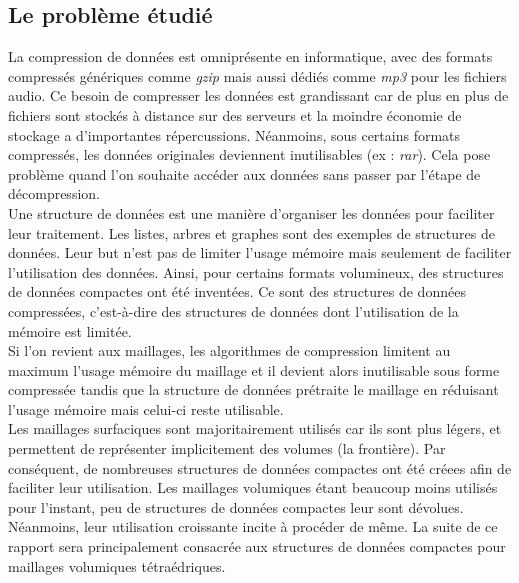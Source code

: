 \subsection*{Le problème étudié}
\noindent
La compression de données est omniprésente en informatique, avec des formats compressés génériques comme \textit{gzip} mais aussi dédiés comme \textit{mp3} pour les fichiers audio. Ce besoin de compresser les données est grandissant car de plus en plus de fichiers sont stockés à distance sur des serveurs et la moindre économie de stockage a d'importantes répercussions. Néanmoins, sous certains formats compressés, les données originales deviennent inutilisables (ex : \textit{rar}). Cela pose problème quand l'on souhaite accéder aux données  sans passer par l'étape de décompression.\\
Une structure de données est une manière d'organiser les données pour faciliter leur traitement. Les listes, arbres et graphes sont des exemples de structures de données. Leur but n'est pas de limiter l'usage mémoire mais seulement de faciliter l'utilisation des données. Ainsi, pour certains formats volumineux, des structures de données compactes ont été inventées. Ce sont des structures de données compressées, c'est-à-dire des structures de données dont l'utilisation de la mémoire est limitée.\\
Si l'on revient aux maillages, les algorithmes de compression limitent au maximum l'usage mémoire du maillage et il devient alors inutilisable sous forme compressée tandis que la structure de données prétraite le maillage en réduisant l'usage mémoire mais celui-ci reste utilisable.\\ 
Les maillages surfaciques sont majoritairement utilisés car ils sont plus légers, et permettent de représenter implicitement des volumes (la frontière). Par conséquent, de nombreuses structures de données compactes ont été créees afin de faciliter leur utilisation. Les maillages volumiques étant beaucoup moins utilisés pour l'instant, peu de structures de données compactes leur sont dévolues. Néanmoins, leur utilisation croissante incite à procéder de même. La suite de ce rapport sera principalement consacrée aux structures de données compactes pour maillages volumiques tétraédriques.
\newpage
